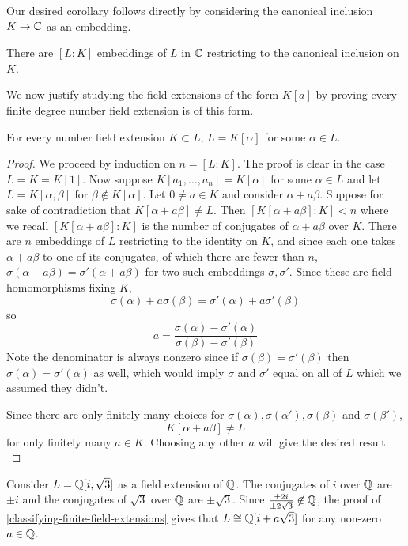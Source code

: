 Our desired corollary follows directly by considering the canonical inclusion $K\rightarrow \mathbb{C}$ as an embedding.
\begin{corollary}
There are $[L:K]$ embeddings of $L$ in $\mathbb{C}$ restricting to the canonical inclusion on $K$.
\end{corollary}

We now justify studying the field extensions of the form $K[a]$ by proving every finite degree number field extension is of this form.

\begin{theorem}\label{classifying-finite-field-extensions}
For every number field extension $K\subset L$, $L=K[\alpha]$ for some $\alpha \in L$.
\end{theorem}
\begin{proof}
We proceed by induction on $n=[L:K]$. The proof is clear in the case $L=K=K[1]$. Now suppose $K[a_1,\dots,a_{n}]=K[\alpha]$ for some $\alpha \in L$ and let $L=K[\alpha,\beta]$ for $\beta\not\in K[\alpha]$. Let $0\neq a\in K$ and consider $\alpha+a\beta$. Suppose for sake of contradiction that $K[\alpha+a\beta]\neq L$. Then $[K[\alpha+a\beta]:K]<n$ where we recall $[K[\alpha+a\beta]:K]$ is the number of conjugates of $\alpha+a\beta$ over $K$. There are $n$ embeddings of $L$ restricting to the identity on $K$, and since each one takes $\alpha+a\beta$ to one of its conjugates, of which there are fewer than $n$, $\sigma(\alpha+a\beta)=\sigma'(\alpha+a\beta)$ for two such embeddings $\sigma,\sigma'$. Since these are field homomorphisms fixing $K$, 
$$\sigma(\alpha)+a\sigma(\beta)=\sigma'(\alpha)+a\sigma'(\beta)$$
so
$$a=\frac{\sigma(\alpha)-\sigma'(\alpha)}{\sigma(\beta)-\sigma'(\beta)}$$
Note the denominator is always nonzero since if $\sigma(\beta)=\sigma'(\beta)$ then $\sigma(\alpha)=\sigma'(\alpha)$ as well, which would imply $\sigma$ and $\sigma'$ equal on all of $L$ which we assumed they didn't.

Since there are only finitely many choices for $\sigma(\alpha),\sigma(\alpha'),\sigma(\beta)$ and $\sigma(\beta')$,
$$K[\alpha+a\beta]\neq L$$
for only finitely many $a\in K$. Choosing any other $a$ will give the desired result. \cite{NumberFields}
\end{proof}

\begin{example}
Consider $L=\mathbb{Q}[i,\sqrt{3}]$ as a field extension of $\mathbb{Q}$. The conjugates of $i$ over $\mathbb{Q}$ are $\pm i$ and the conjugates of $\sqrt{3}$ over $\mathbb{Q}$ are $\pm \sqrt{3}$. Since $\frac{\pm 2i}{\pm 2\sqrt{3}}\not \in \mathbb{Q}$, the proof of \cref{classifying-finite-field-extensions} gives that $L\cong \mathbb{Q}[i+a\sqrt{3}]$ for any non-zero $a\in \mathbb{Q}$.
$$$$
\end{example}


